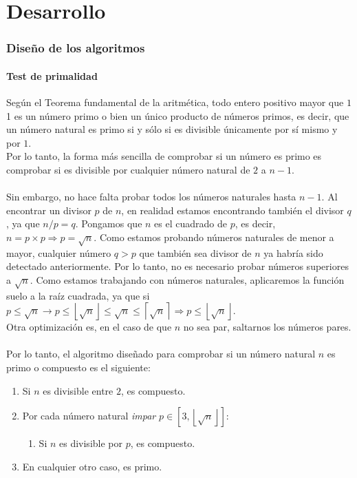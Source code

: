 \part{Desarrollo}


\section{Diseño de los algoritmos}
\subsection{Test de primalidad}
Según el Teorema fundamental de la aritmética, todo entero positivo mayor que $1$1 es un número primo o bien un único producto de números primos, es decir, que un número natural es primo si y sólo si es divisible únicamente por sí mismo y por $1$.\\
Por lo tanto, la forma más sencilla de comprobar si un número es primo es comprobar si es divisible por cualquier número natural de $2$ a $n-1$.\\
\\
Sin embargo, no hace falta probar todos los números naturales hasta $n-1$. Al encontrar un divisor $p$ de $n$, en realidad estamos encontrando también el divisor $q$, ya que $n / p = q$. Pongamos que $n$ es el cuadrado de $p$, es decir, $n = p \times p \Rightarrow p = \sqrt{n}$. Como estamos probando números naturales de menor a mayor, cualquier número $q > p$ que también sea divisor de $n$ ya habría sido detectado anteriormente. Por lo tanto, no es necesario probar números superiores a $\sqrt{n}$. Como estamos trabajando con números naturales, aplicaremos la función suelo a la raíz cuadrada, ya que si $p \leq \sqrt{n} \rightarrow p \leq \left \lfloor \sqrt{n} \right \rfloor \leq \sqrt{n} \leq \left \lceil \sqrt{n} \right \rceil \Rightarrow p \leq \left \lfloor \sqrt{n} \right \rfloor$.\\
Otra optimización es, en el caso de que $n$ no sea par, saltarnos los números pares.\\
\\
Por lo tanto, el algoritmo diseñado para comprobar si un número natural $n$ es primo o compuesto es el siguiente:
\begin{enumerate}
    \item Si $n$ es divisible entre $2$, es compuesto.
    \item Por cada número natural \textit{impar} $p \in [3, \left \lfloor \sqrt{n} \right \rfloor]$:
    \begin{enumerate}
        \item Si $n$ es divisible por $p$, es compuesto.
    \end{enumerate}
    \item En cualquier otro caso, es primo.
\end{enumerate}

